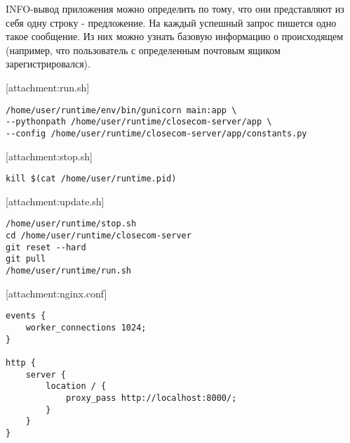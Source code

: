 \documentclass[progmanual]{espd}
\begin{document}
INFO-вывод приложения можно определить по тому, что они представляют из себя одну строку - предложение. На каждый успешный запрос пишется одно такое сообщение. Из них можно узнать базовую информацию о происходящем (например, что пользователь с определенным почтовым ящиком зарегистрировался).



[attachment:run.sh]
\begin{verbatim}
/home/user/runtime/env/bin/gunicorn main:app \
--pythonpath /home/user/runtime/closecom-server/app \
--config /home/user/runtime/closecom-server/app/constants.py
\end{verbatim}

[attachment:stop.sh]
\begin{verbatim}
kill $(cat /home/user/runtime.pid)
\end{verbatim}

[attachment:update.sh]
\begin{verbatim}
/home/user/runtime/stop.sh
cd /home/user/runtime/closecom-server
git reset --hard
git pull
/home/user/runtime/run.sh
\end{verbatim}

[attachment:nginx.conf]
\begin{verbatim}
events {
    worker_connections 1024;
}

http {
    server {
        location / {
            proxy_pass http://localhost:8000/;
        }
    }
}
\end{verbatim}
\end{document}
